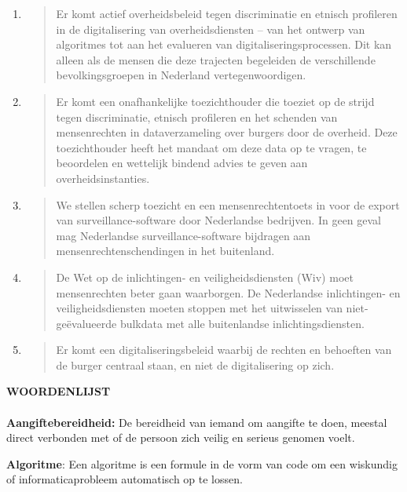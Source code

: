 \begin{enumerate}
\def\labelenumi{\arabic{enumi}.}
\item
  \begin{quote}
  Er komt actief overheidsbeleid tegen discriminatie en etnisch
  profileren in de digitalisering van overheidsdiensten -- van het
  ontwerp van algoritmes tot aan het evalueren van
  digitaliseringsprocessen. Dit kan alleen als de mensen die deze
  trajecten begeleiden de verschillende bevolkingsgroepen in Nederland
  vertegenwoordigen.
  \end{quote}
\item
  \begin{quote}
  Er komt een onafhankelijke toezichthouder die toeziet op de strijd
  tegen discriminatie, etnisch profileren en het schenden van
  mensenrechten in dataverzameling over burgers door de overheid. Deze
  toezichthouder heeft het mandaat om deze data op te vragen, te
  beoordelen en wettelijk bindend advies te geven aan
  overheidsinstanties.
  \end{quote}
\item
  \begin{quote}
  We stellen scherp toezicht en een mensenrechtentoets in voor de export
  van surveillance-software door Nederlandse bedrijven. In geen geval
  mag Nederlandse surveillance-software bijdragen aan
  mensenrechtenschendingen in het buitenland.
  \end{quote}
\item
  \begin{quote}
  De Wet op de inlichtingen- en veiligheidsdiensten (Wiv) moet
  mensenrechten beter gaan waarborgen. De Nederlandse inlichtingen- en
  veiligheidsdiensten moeten stoppen met het uitwisselen van
  niet-geëvalueerde bulkdata met alle buitenlandse inlichtingsdiensten.
  \end{quote}
\item
  \begin{quote}
  Er komt een digitaliseringsbeleid waarbij de rechten en behoeften van
  de burger centraal staan, en niet de digitalisering op zich.
  \end{quote}
\end{enumerate}

\textbf{WOORDENLIJST\\
~\\
Aangiftebereidheid:} De bereidheid van iemand om aangifte te doen,
meestal direct verbonden met of de persoon zich veilig en serieus
genomen voelt.

\textbf{Algoritme}: Een algoritme is een formule in de vorm van code om
een wiskundig of informaticaprobleem automatisch op te lossen.

